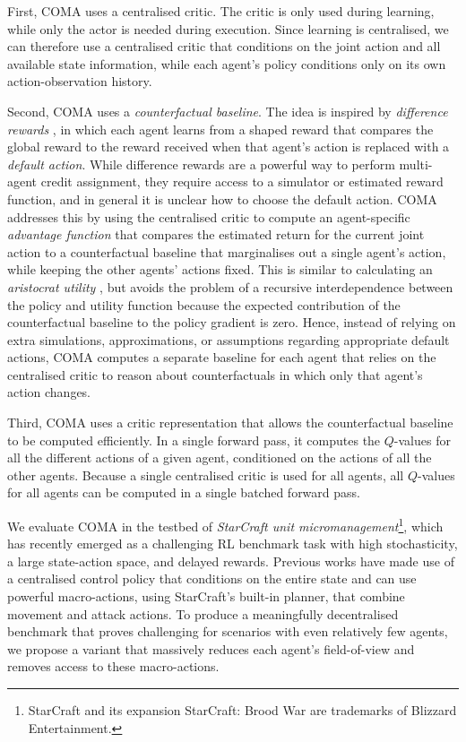\documentclass[letterpaper]{article}
\newcommand{\citep}{\cite}
\begin{document}
First, COMA uses a centralised critic. The critic is only used during learning, 
while only the actor is needed during execution. Since learning is centralised, 
we can therefore use a centralised critic that conditions on the joint action 
and all available state information, while each agent's policy conditions only 
on its own action-observation history.

Second, COMA uses a \emph{counterfactual baseline}.  The idea is inspired by 
\emph{difference rewards} \citep{wolpert2002optimal,tumer2007distributed}, in 
which each agent 
learns from a shaped reward that compares the global reward to the reward 
received when that agent's action is replaced with a \emph{default action}.  
While difference rewards are a powerful way to perform multi-agent credit 
assignment, they require access to a simulator or estimated reward 
function, and in general it is unclear how to choose the default 
action. COMA addresses this by using the centralised critic to compute an agent-specific
\emph{advantage function} that compares the estimated return for the 
current joint action  to a counterfactual baseline that marginalises out a 
single 
agent's action, while keeping the other agents' actions fixed. This is similar 
to calculating an \emph{aristocrat utility} \citep{wolpert2002optimal}, but 
avoids the problem of a recursive interdependence between the policy and utility function 
because the expected contribution of the counterfactual baseline to 
the policy gradient is zero.
Hence, instead of relying on extra simulations, approximations, or assumptions 
regarding appropriate default actions, COMA computes a separate 
baseline for each agent that relies on the centralised critic to reason about
counterfactuals in which only that agent's action changes.

Third, COMA uses a critic representation that allows the counterfactual baseline to be computed efficiently.  In a single forward pass, it computes the $Q$-values for all the different actions of a given agent, conditioned on the actions of all the other agents.   Because a single centralised critic is used for all agents, all $Q$-values for all agents can be computed in a single batched forward pass.

We evaluate COMA in the testbed of \emph{StarCraft unit 
micromanagement}\footnote{StarCraft and its expansion StarCraft: Brood War are 
trademarks of Blizzard Entertainment\texttrademark.}, which has recently 
emerged as a challenging RL benchmark task with high stochasticity, a large 
state-action space, and delayed rewards. Previous works  
\citep{usunier2016episodic,peng2017multiagent} have made use of a centralised 
control policy that conditions on the entire state and can use powerful 
macro-actions, using StarCraft's built-in planner, that combine movement and 
attack actions. To produce a meaningfully decentralised benchmark that proves 
challenging for scenarios with even relatively few agents, we propose a variant 
that massively reduces each agent's field-of-view and removes access to these 
macro-actions.
\end{document}
